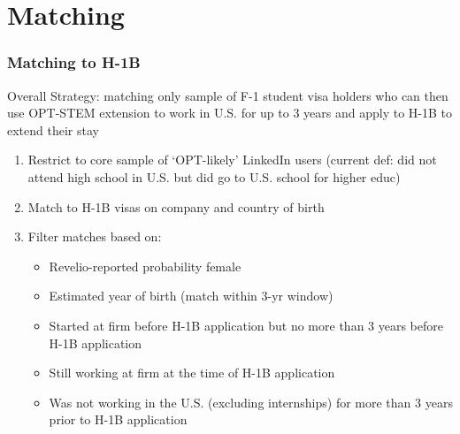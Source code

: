 \documentclass[xcolor=dvipsnames, compress, 12pt, aspectratio=169, handout]{beamer}
\begin{document}
\section{Matching}
\begin{frame}
    \frametitle{Matching to H-1B}
    Overall Strategy: matching only sample of F-1 student visa holders who can then use OPT-STEM extension to work in U.S. for up to 3 years and apply to H-1B to extend their stay
    \begin{enumerate}
        \item Restrict to core sample of `OPT-likely' LinkedIn users (current def: did not attend high school in U.S. but did go to U.S. school for higher educ)
        \item Match to H-1B visas on company and country of birth 
        \item Filter matches based on:
        \begin{itemize}
            \item Revelio-reported probability female 
            \item Estimated year of birth (match within 3-yr window)
            \item Started at firm before H-1B application but no more than 3 years before H-1B application
            \item Still working at firm at the time of H-1B application
            \item Was not working in the U.S. (excluding internships) for more than 3 years prior to H-1B application 
        \end{itemize}
    \end{enumerate}
\end{frame}
\end{document}
